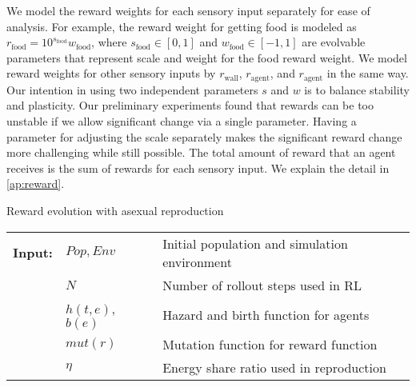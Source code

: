 We model the reward weights for each sensory input separately for ease of analysis. For example, the reward weight for getting food is modeled as $r_{\mathrm{food}} = 10^{s_{\mathrm{food}}} w_{\mathrm{food}}$, where $s_{\mathrm{food}} \in [0, 1]$ and $w_{\mathrm{food}} \in [-1, 1]$ are evolvable parameters that represent scale and weight for the food reward weight. We model reward weights for other sensory inputs by $r_\mathrm{wall}$, $r_\mathrm{agent}$, and $r_\mathrm{agent}$ in the same way. Our intention in using two independent parameters $s$ and $w$ is to balance stability and plasticity. Our preliminary experiments found that rewards can be too unstable if we allow significant change via a single parameter. Having a parameter for adjusting the scale separately makes the significant reward change more challenging while still possible. The total amount of reward that an agent receives is the sum of rewards for each sensory input. We explain the detail in \cref{ap:reward}.

\begin{algorithm}
  \caption{Reward evolution with asexual reproduction}\label{alg:reward-evo}
  \begin{tabular}{lll}
    \textbf{Input:} & $Pop, Env$ & Initial population and simulation environment\\
                    & $N$ & Number of rollout steps used in RL \\
                    & $h(t, e)$, $b(e)$ & Hazard and birth function for agents \\
                    & $mut(r)$ & Mutation function for reward function \\
                    & $\eta$ & Energy share ratio used in reproduction
  \end{tabular}
  \begin{algorithmic}[1]
    \Loop{}
      \EndOnce{}
    \EndFor{}

      \EndWith{}
      \EndWith{}
    \EndFor{}
  \EndLoop{}
\end{algorithmic}
\end{algorithm}

